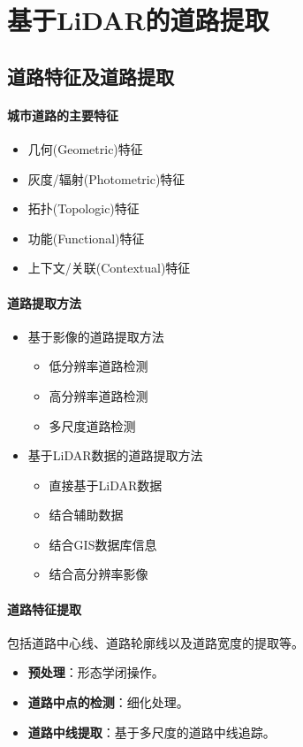 \section{基于LiDAR的道路提取}
\subsection{道路特征及道路提取}
\paragraph{城市道路的主要特征}
\begin{itemize}
	\item 几何(Geometric)特征
	\item 灰度/辐射(Photometric)特征
	\item 拓扑(Topologic)特征
	\item 功能(Functional)特征
	\item 上下文/关联(Contextual)特征
\end{itemize}

\paragraph{道路提取方法}
\begin{itemize}
	\item 基于影像的道路提取方法
	\begin{itemize}
		\item 低分辨率道路检测
		\item 高分辨率道路检测
		\item 多尺度道路检测
	\end{itemize}
	\item 基于LiDAR数据的道路提取方法
	\begin{itemize}
		\item 直接基于LiDAR数据
		\item 结合辅助数据
		\item 结合GIS数据库信息
		\item 结合高分辨率影像
	\end{itemize}
\end{itemize}

\paragraph{道路特征提取}包括道路中心线、道路轮廓线以及道路宽度的提取等。
\begin{itemize}
	\item \textbf{预处理}：形态学闭操作。
	\item \textbf{道路中点的检测}：细化处理。
	\item \textbf{道路中线提取}：基于多尺度的道路中线追踪。
\end{itemize}

